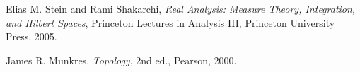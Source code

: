 \documentclass[12pt, a4paper, openany, twoside]{book}
\theoremstyle{definition}
\theoremstyle{remark}
\theoremstyle{plain}
\numberwithin{equation}{section}
\begin{document}
\newpage

\begin{thebibliography}{99}

Elias M. Stein and Rami Shakarchi,
\textit{Real Analysis: Measure Theory, Integration, and Hilbert Spaces},
Princeton Lectures in Analysis III, Princeton University Press, 2005.

James R. Munkres,  
\textit{Topology},  
2nd ed., Pearson, 2000.

\end{thebibliography}
\end{document}
